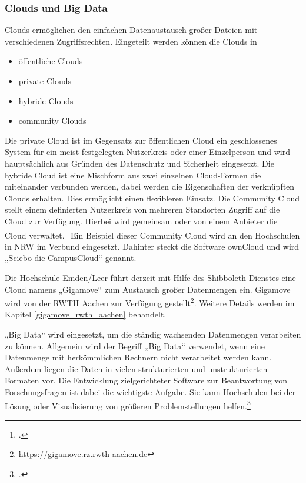 \subsubsection{Clouds und Big Data}
Clouds ermöglichen den einfachen Datenaustausch großer Dateien mit verschiedenen Zugriffsrechten. Eingeteilt werden können die Clouds in

\begin{itemize}
	\item öffentliche Clouds
	\item private Clouds
	\item hybride Clouds
	\item community Clouds
\end{itemize}

Die private Cloud ist im Gegensatz zur öffentlichen Cloud ein geschlossenes System für ein meist festgelegten Nutzerkreis oder einer Einzelperson und wird hauptsächlich aus Gründen des Datenschutz und Sicherheit eingesetzt.
Die hybride Cloud ist eine Mischform aus zwei einzelnen Cloud-Formen die miteinander verbunden werden, dabei werden die Eigenschaften der verknüpften Clouds erhalten. Dies ermöglicht einen flexibleren Einsatz.
Die Community Cloud stellt einem definierten Nutzerkreis von mehreren Standorten Zugriff auf die Cloud zur Verfügung. Hierbei wird gemeinsam oder von einem Anbieter die Cloud verwaltet.\footcite[Vgl.][3]{nistpub_2011}
Ein Beispiel dieser Community Cloud wird an den Hochschulen in NRW im Verbund eingesetzt. Dahinter steckt die Software ownCloud und wird „Sciebo die CampusCloud“ genannt.

Die Hochschule Emden/Leer führt derzeit mit Hilfe des Shibboleth-Dienstes eine Cloud namens „Gigamove“ zum Austausch großer Datenmengen ein. Gigamove wird von der RWTH Aachen zur Verfügung gestellt\footnote{\url{https://gigamove.rz.rwth-aachen.de}}. Weitere Details werden im Kapitel \ref{gigamove_rwth_aachen} behandelt.

„Big Data“ wird eingesetzt, um die ständig wachsenden Datenmengen verarbeiten zu können. Allgemein wird der Begriff „Big Data“ verwendet, wenn eine Datenmenge mit herkömmlichen Rechnern nicht verarbeitet werden kann. Außerdem liegen die Daten in vielen strukturierten und unstrukturierten Formaten vor. Die Entwicklung zielgerichteter Software zur Beantwortung von Forschungsfragen ist dabei die wichtigste Aufgabe. Sie kann Hochschulen bei der Lösung oder Visualisierung von größeren Problemstellungen helfen.\footcite[Vgl.][65]{keller_klein_tuschl_2015}



